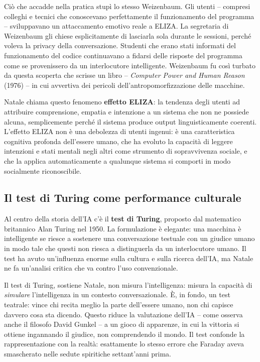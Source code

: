 \documentclass[a4paper,11pt]{article}
\begin{document}
Ciò che accadde nella pratica stupì lo stesso Weizenbaum. Gli utenti -- compresi colleghi e tecnici che conoscevano perfettamente il funzionamento del programma -- sviluppavano un attaccamento emotivo reale a ELIZA. La segretaria di Weizenbaum gli chiese esplicitamente di lasciarla sola durante le sessioni, perché voleva la privacy della conversazione. Studenti che erano stati informati del funzionamento del codice continuavano a fidarsi delle risposte del programma come se provenissero da un interlocutore intelligente. Weizenbaum fu così turbato da questa scoperta che scrisse un libro -- \emph{Computer Power and Human Reason} (1976) -- in cui avvertiva dei pericoli dell'antropomorfizzazione delle macchine.

Natale chiama questo fenomeno \textbf{effetto ELIZA}: la tendenza degli utenti ad attribuire comprensione, empatia e intenzione a un sistema che non ne possiede alcuna, semplicemente perché il sistema produce output linguisticamente coerenti. L'effetto ELIZA non è una debolezza di utenti ingenui: è una caratteristica cognitiva profonda dell'essere umano, che ha evoluto la capacità di leggere intenzioni e stati mentali negli altri come strumento di sopravvivenza sociale, e che la applica automaticamente a qualunque sistema si comporti in modo socialmente riconoscibile.

\subsection{Il test di Turing come performance culturale}

Al centro della storia dell'IA c'è il \textbf{test di Turing}, proposto dal matematico britannico Alan Turing nel 1950. La formulazione è elegante: una macchina è intelligente se riesce a sostenere una conversazione testuale con un giudice umano in modo tale che questi non riesca a distinguerla da un interlocutore umano. Il test ha avuto un'influenza enorme sulla cultura e sulla ricerca dell'IA, ma Natale ne fa un'analisi critica che va contro l'uso convenzionale.

Il test di Turing, sostiene Natale, non misura l'intelligenza: misura la capacità di \emph{simulare} l'intelligenza in un contesto conversazionale. È, in fondo, un test teatrale: vince chi recita meglio la parte dell'essere umano, non chi capisce davvero cosa sta dicendo. Questo riduce la valutazione dell'IA -- come osserva anche il filosofo David Gunkel -- a un gioco di apparenze, in cui la vittoria si ottiene ingannando il giudice, non comprendendo il mondo. Il test confonde la rappresentazione con la realtà: esattamente lo stesso errore che Faraday aveva smascherato nelle sedute spiritiche settant'anni prima.
\end{document}
